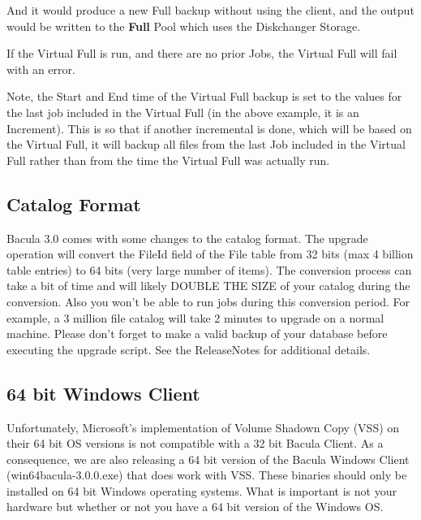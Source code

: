 And it would produce a new Full backup without using the client, and the output
would be written to the {\bf Full} Pool which uses the Diskchanger Storage.

If the Virtual Full is run, and there are no prior Jobs, the Virtual Full will
fail with an error.

Note, the Start and End time of the Virtual Full backup is set to the
values for the last job included in the Virtual Full (in the above example,
it is an Increment). This is so that if another incremental is done, which
will be based on the Virtual Full, it will backup all files from the
last Job included in the Virtual Full rather than from the time the Virtual
Full was actually run.



\subsection{Catalog Format}
Bacula 3.0 comes with some changes to the catalog format.  The upgrade
operation will convert the FileId field of the File table from 32 bits (max 4
billion table entries) to 64 bits (very large number of items).  The
conversion process can take a bit of time and will likely DOUBLE THE SIZE of
your catalog during the conversion.  Also you won't be able to run jobs during
this conversion period.  For example, a 3 million file catalog will take 2
minutes to upgrade on a normal machine.  Please don't forget to make a valid
backup of your database before executing the upgrade script. See the 
ReleaseNotes for additional details.

\subsection{64 bit Windows Client}
Unfortunately, Microsoft's implementation of Volume Shadown Copy (VSS) on
their 64 bit OS versions is not compatible with a 32 bit Bacula Client.
As a consequence, we are also releasing a 64 bit version of the Bacula 
Windows Client (win64bacula-3.0.0.exe) that does work with VSS. 
These binaries should only be installed on 64 bit Windows operating systems.
What is important is not your hardware but whether or not you have
a 64 bit version of the Windows OS.  

